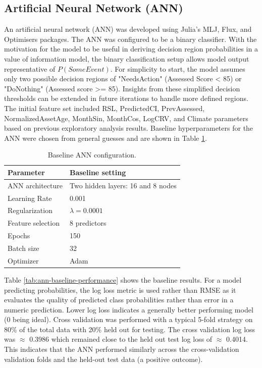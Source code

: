 \documentclass[NewProceedings,letterpaper,NoPageNumbers,NoLineNumbers, DoubleSpace]{ascelike-new}
\begin{document}
\FloatBarrier

\subsection{Artificial Neural Network (ANN)}

An artificial neural network (ANN) was developed using Julia's MLJ, Flux, and Optimisers packages. The ANN was configured to be a binary classifier. With the motivation for the model to be useful in deriving decision region probabilities in a value of information model, the binary classification setup allows model output representative of $P(SomeEvent)$. For simplicity to start, the model assumes only two possible decision regions of "NeedsAction" (Assessed Score < 85) or "DoNothing" (Assessed score >= 85). Insights from these simplified decision thresholds can be extended in future iterations to handle more defined regions. The initial feature set included RSL, PredictedCI, PrevAssessed, NormalizedAssetAge, MonthSin, MonthCos, LogCRV, and Climate parameters based on previous exploratory analysis results. Baseline hyperparameters for the ANN were chosen from general guesses and are shown in Table \ref{tab:ann-baseline}.

\begin{table}[htbp]
\centering
\caption{Baseline ANN configuration.}
\label{tab:ann-baseline}
\begin{tabular}{ll}
\hline
\textbf{Parameter} & \textbf{Baseline setting} \\
\hline
ANN architecture & Two hidden layers: 16 and 8 nodes \\
Learning Rate & 0.001 \\
Regularization & $\lambda = 0.0001$ \\
Feature selection & 8 predictors \\
Epochs & 150 \\
Batch size & 32 \\
Optimizer & Adam \\
\hline
\end{tabular}
\end{table}

Table \ref{tab:ann-baseline-performance} shows the baseline results.  For a model predicting probabilities, the log loss metric is used rather than RMSE as it evaluates the quality of predicted class probabilities rather than error in a numeric prediction. Lower log loss indicates a generally better performing model (0 being ideal). Cross validation was performed with a typical 5-fold strategy on 80\% of the total data with 20\% held out for testing. The cross validation log loss was $\approx$ 0.3986 which remained close to the held out test log loss of $\approx$ 0.4014. This indicates that the ANN performed similarly across the cross-validation validation folds and the held-out test data (a positive outcome).
\end{document}
